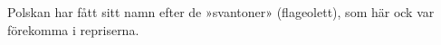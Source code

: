 Polskan har fått sitt namn efter de »svantoner» (flageolett),
som här ock var förekomma i repriserna.
